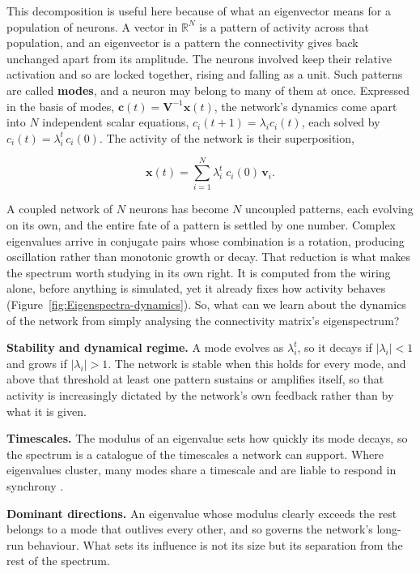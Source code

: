 This decomposition is useful here because of what an eigenvector means for a population of neurons.
A vector in $\mathbb{R}^{N}$ is a pattern of activity across that population, and an eigenvector is a
pattern the connectivity gives back unchanged apart from its amplitude. The neurons involved keep
their relative activation and so are locked together, rising and falling as a unit. Such patterns are
called \textbf{modes}, and a neuron may belong to many of them at once. Expressed in the basis of
modes, $\mathbf{c}(t) = \mathbf{V}^{-1}\mathbf{x}(t)$, the network's dynamics come apart into $N$
independent scalar equations, $c_i(t+1) = \lambda_i c_i(t)$, each solved by
$c_i(t) = \lambda_i^{t}\,c_i(0)$. The activity of the network is their superposition,

\begin{equation}
    \mathbf{x}(t) = \sum_{i=1}^{N} \lambda_i^{t}\;c_i(0)\,\mathbf{v}_i.
    \label{eq:mode_superposition}
\end{equation}

A coupled network of $N$ neurons has become $N$ uncoupled patterns, each evolving on its own, and the
entire fate of a pattern is settled by one number. 
Complex eigenvalues arrive in conjugate pairs whose combination is a rotation, producing
oscillation rather than monotonic growth or decay.
That reduction is what makes the spectrum worth studying in its own right. 
It is computed from the wiring alone, before anything is simulated, yet it already fixes how activity 
behaves (Figure~\ref{fig:Eigenspectra-dynamics}). So, what can we learn about the dynamics of the network 
from simply analysing the connectivity matrix's eigenspectrum?

\begin{keyideas}
    \item \textbf{Stability and dynamical regime.} A mode evolves as $\lambda_i^{t}$, so it decays
    if $|\lambda_i| < 1$ and grows if $|\lambda_i| > 1$. The network is stable when this holds for
    every mode, and above that threshold at least one pattern sustains or amplifies itself, so that
    activity is increasingly dictated by the network's own feedback rather than by what it is given.

    \item \textbf{Timescales.} The modulus of an eigenvalue sets how quickly its mode decays, so the
    spectrum is a catalogue of the timescales a network can support. Where eigenvalues cluster, many
    modes share a timescale and are liable to respond in synchrony \cite{rajan2006eigenvalue}.

    \item \textbf{Dominant directions.} An eigenvalue whose modulus clearly exceeds the rest belongs
    to a mode that outlives every other, and so governs the network's long-run behaviour. What sets
    its influence is not its size but its separation from the rest of the spectrum.
\end{keyideas}

